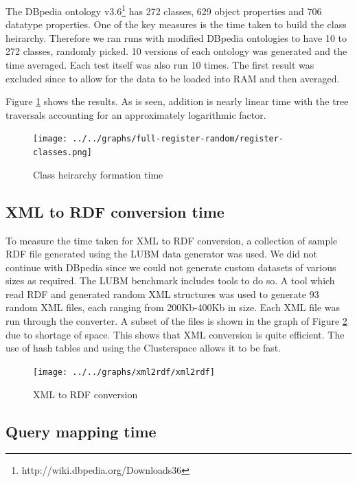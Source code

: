\documentclass[journal]{IEEEtran}
\begin{document}
The DBpedia ontology
v3.6\footnote{http://wiki.dbpedia.org/Downloads36} has 272 classes, 629 object
properties and 706 datatype properties. One of the key measures is the time
taken to build the class heirarchy. Therefore we ran runs with modified DBpedia
ontologies to have
10 to 272 classes, randomly picked. 10 versions of each ontology was generated
and the time averaged. Each test itself was also run 10 times. The first
result was excluded since to allow for the data to be loaded into RAM and
then averaged.

Figure \ref{fig:eval:cs-ch-form} shows the results. As is seen, addition is
nearly linear time with the tree traversals
accounting for an approximately logarithmic factor.

\begin{figure}[h]
    \centering
    \texttt{[image: ../../graphs/full-register-random/register-classes.png]}
    \caption{Class heirarchy formation time}
    \label{fig:eval:cs-ch-form}
\end{figure}

\subsection{XML to RDF conversion time}

To measure the time taken for XML to RDF conversion, a collection of sample RDF
file generated using the LUBM data generator was used. We did not continue with
DBpedia since we could not generate custom datasets of various sizes as
required. The LUBM benchmark includes tools to do so. A tool which read RDF and
generated random XML structures was used to generate 93 random XML files, each
ranging from 200Kb-400Kb in size.  Each XML file was run through the converter.
A subset of the files is shown in the graph of Figure \ref{fig:eval:xml2rdf}
due to shortage of space.  This shows that XML conversion is quite efficient.
The use of hash tables and using the Clusterspace allows it to be fast.

\begin{figure}[h]
    \centering
    \texttt{[image: ../../graphs/xml2rdf/xml2rdf]}
    \caption{XML to RDF conversion}
    \label{fig:eval:xml2rdf}
\end{figure}

\subsection{Query mapping time}
\end{document}
